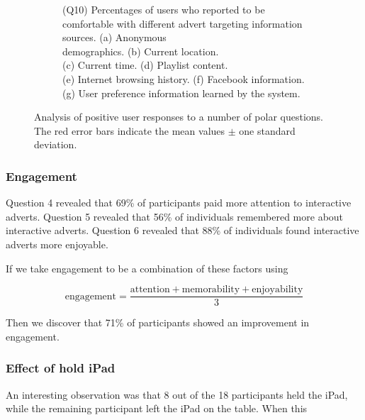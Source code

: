 \begin{figure}[h!]
\begin{subfigure}[t]{0.49\textwidth}
			\caption{(Q10) Percentages of users who reported to be comfortable with different advert targeting information sources. (a) Anonymous \\demographics. (b) Current location. \\(c) Current time. (d) Playlist content. \\(e) Internet browsing history. (f) Facebook information. (g) User preference information learned by the system.}
		\end{subfigure}
		\caption{Analysis of positive user responses to a number of polar questions. The red error bars indicate the mean values $\pm$ one standard deviation.}
		\label{fig:qualitative_results}
	\end{figure}


	\subsubsection{Engagement}

	Question 4 revealed that 69\% of participants paid more attention to interactive adverts. Question 5 revealed that 56\% of individuals remembered more about interactive adverts. Question 6 revealed that 88\% of individuals found interactive adverts more enjoyable. 

	If we take engagement to be a combination of these factors using

	\begin{equation}
	\text{engagement} = \frac{\text{attention} + \text{memorability} + \text{enjoyability}}{3}
	\end{equation}

	Then we discover that 71\% of participants showed an improvement in engagement.


	\subsubsection{Effect of hold iPad}

	An interesting observation was that 8 out of the 18 participants held the iPad, while the remaining participant left the iPad on the table. When this 

